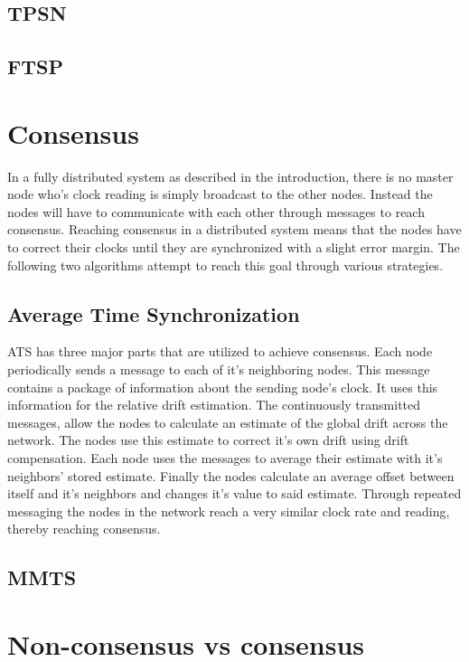 \documentclass{sciposter}
\begin{document}
\begin{multicols}{3}
\subsection{TPSN}

\subsection{FTSP}

\section{Consensus}
In a fully distributed system as described in the introduction, there is no master node who's clock reading is simply broadcast to the other nodes. Instead the nodes will have to communicate with each other through messages to reach consensus. Reaching consensus in a distributed system means that the nodes have to correct their clocks until they are synchronized with a slight error margin. The following two algorithms attempt to reach this goal through various strategies.

\subsection{Average Time Synchronization}
ATS has three major parts that are utilized to achieve consensus. Each node periodically sends a message to each of it's neighboring nodes. This message contains a package of information about the sending node's clock. It uses this information for the relative drift estimation. The continuously transmitted messages, allow the nodes to calculate an estimate of the global drift across the network. The nodes use this estimate to correct it's own drift using drift compensation. Each node uses the messages to average their estimate with it's neighbors' stored estimate. Finally the nodes calculate an average offset between itself and it's neighbors and changes it's value to said estimate. Through repeated messaging the nodes in the network reach a very similar clock rate and reading, thereby reaching consensus.

\subsection{MMTS}


\section{Non-consensus vs consensus}


\end{multicols}
\end{document}
